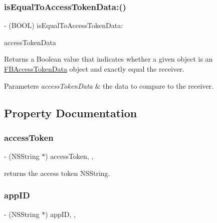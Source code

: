 \subsubsection{\texorpdfstring{is\+Equal\+To\+Access\+Token\+Data\+:()}{isEqualToAccessTokenData:()}\hspace{0.1cm}{\footnotesize\ttfamily [5/5]}}
{\footnotesize\ttfamily -\/ (B\+O\+OL) is\+Equal\+To\+Access\+Token\+Data\+: \begin{DoxyParamCaption}\item[{(\hyperlink{interfaceFBAccessTokenData}{F\+B\+Access\+Token\+Data} $\ast$)}]{access\+Token\+Data }\end{DoxyParamCaption}}

Returns a Boolean value that indicates whether a given object is an \hyperlink{interfaceFBAccessTokenData}{F\+B\+Access\+Token\+Data} object and exactly equal the receiver.


\begin{DoxyParams}{Parameters}
{\em access\+Token\+Data} & the data to compare to the receiver. \\
\hline
\end{DoxyParams}


\subsection{Property Documentation}
\mbox{\label{interfaceFBAccessTokenData_aa550958def1ed82feed2dd230bce0f6f}} 
\subsubsection{\texorpdfstring{access\+Token}{accessToken}}
{\footnotesize\ttfamily -\/ (N\+S\+String $\ast$) access\+Token\hspace{0.3cm}{\ttfamily [read]}, {\ttfamily [nonatomic]}, {\ttfamily [copy]}}

returns the access token N\+S\+String. \mbox{\label{interfaceFBAccessTokenData_a682373ec99795fc490ec67f8835e3fb4}} 
\subsubsection{\texorpdfstring{app\+ID}{appID}}
{\footnotesize\ttfamily -\/ (N\+S\+String $\ast$) app\+ID\hspace{0.3cm}{\ttfamily [read]}, {\ttfamily [nonatomic]}, {\ttfamily [copy]}}

